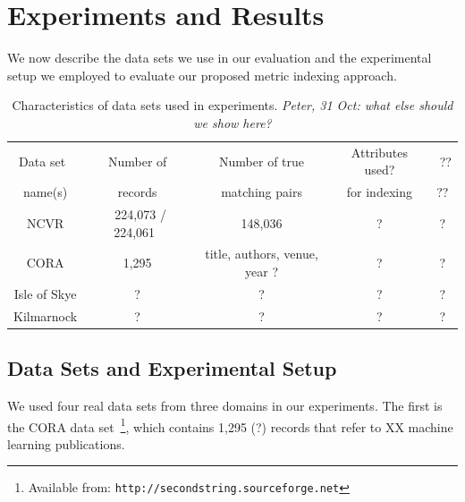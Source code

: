\documentclass{llncs}
\begin{document}
\section{Experiments and Results}
\label{sec-expt}

We now describe the data sets we use in our evaluation and the
experimental setup we employed to evaluate our proposed metric
indexing approach.




\begin{table}[t]
\caption{Characteristics of data sets used in experiments.
  \emph{Peter, 31 Oct: what else should we show here?}}
 \label{table-datasets}
  \centering
  \begin{scriptsize}
  \begin{tabular}{ccccc}
  \hline\noalign{\smallskip}
  Data set~ & ~Number of~ & ~Number of true~
   & Attributes used? & ~?? \\
  name(s)  & records   & matching pairs &
    for indexing & ?? \\
  \noalign{\smallskip}
  \hline
  \noalign{\smallskip}
  NCVR  & ~224,073 / 224,061~ & ~148,036~ & ? & ? \\
  CORA  & 1,295             & title, authors, venue, year ? & ?
    & ? \\
  Isle of Skye & ? & ?
    & ? & ? \\
  Kilmarnock  & ? & ? & ? & ? \\
  \hline
  \end{tabular}
  \end{scriptsize}
\end{table}


\subsection{Data Sets and Experimental Setup}
\label{sec-data}

We used four real data sets from three domains in our experiments. The
first is the CORA data set~\footnote{Available from:
\texttt{http://secondstring.sourceforge.net}}, which contains 1,295
(?) records that refer to XX machine learning publications.
\end{document}
